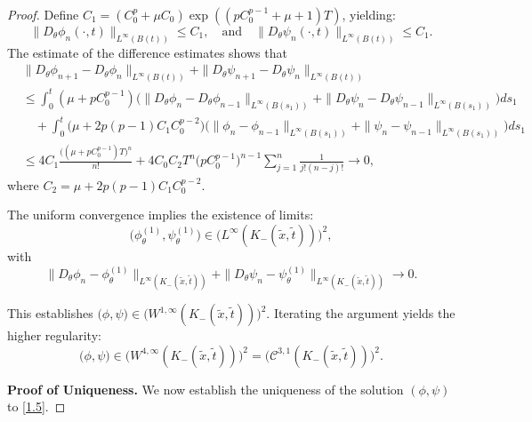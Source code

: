 \documentclass[10pt,a4paper]{amsart}
\begin{document}
\begin{proof}
\medskip

Define $C_1 = (C_0^p+\mu C_0) \exp((pC_0^{p-1}+\mu+1) T)$, yielding:
\begin{equation}
\|D_\theta \phi_n(\cdot, t)\|_{L^\infty(B(t))} \leq C_1, \quad \text{and} \quad \|D_\theta \psi_n(\cdot, t)\|_{L^\infty(B(t))} \leq C_1.
\label{eq:2.8}
\end{equation}
The estimate of the difference estimates shows that
\begin{equation}
\begin{aligned}
&\|D_\theta \phi_{n+1} - D_\theta \phi_n\|_{L^\infty(B(t))} + \|D_\theta \psi_{n+1} - D_\theta \psi_n\|_{L^\infty(B(t))} \\
&\leq \int_0^t (\mu + p C_0^{p-1}) \big(\|D_\theta \phi_n - D_\theta \phi_{n-1}\|_{L^\infty(B(s_1))} + \|D_\theta \psi_n - D_\theta \psi_{n-1}\|_{L^\infty(B(s_1))}\big) ds_1 \\
&\quad + \int_0^t \big(\mu + 2p(p - 1) C_1 C_0^{p-2}\big) \big(\|\phi_n - \phi_{n-1}\|_{L^\infty(B(s_1))} + \|\psi_n - \psi_{n-1}\|_{L^\infty(B(s_1))}\big) ds_1 \\
&\leq 4C_1 \frac{\big((\mu + p C_0^{p-1}) T\big)^n}{n!} + 4 C_0 C_2 T^n \big(p C_0^{p-1}\big)^{n-1} \sum_{j=1}^n \frac{1}{j! (n - j)!} \to 0,
\end{aligned}
\label{eq:2.91}
\end{equation}
where $C_2 = \mu+2p(p - 1)C_1C_0^{p-2}$.

\medskip

The uniform convergence implies the existence of limits:
$$
\big(\phi_\theta^{(1)}, \psi_\theta^{(1)}\big) \in \big(L^\infty(K_-(\tilde{x}, \tilde{t}))\big)^2,
$$
with
$$
\|D_\theta \phi_n - \phi_\theta^{(1)}\|_{L^\infty(K_-(\tilde{x}, \tilde{t}))} + \|D_\theta \psi_n - \psi_\theta^{(1)}\|_{L^\infty(K_-(\tilde{x}, \tilde{t}))} \to 0.
$$

This establishes $\big(\phi, \psi\big) \in \big(W^{1, \infty}(K_-(\tilde{x}, \tilde{t}))\big)^2$. Iterating the argument yields the higher regularity:
$$
\big(\phi, \psi\big) \in \big(W^{4, \infty}(K_-(\tilde{x}, \tilde{t}))\big)^2 = \big(\mathcal{C}^{3, 1}(K_-(\tilde{x}, \tilde{t}))\big)^2.
$$


\noindent\textbf{Proof of Uniqueness.}
We now establish the uniqueness of the solution $(\phi, \psi)$ to \eqref{1.5}. 
 

\end{proof}
\end{document}
